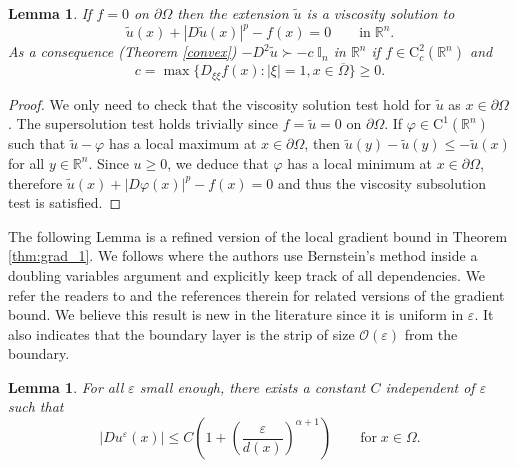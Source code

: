 \documentclass[12pt,reqno]{amsart}
\numberwithin{figure}{section}
\theoremstyle{plain}
\newtheorem{lem}[thm]{Lemma}
\theoremstyle{remark}
\numberwithin{equation}{section}
\newcommand{\R}{\mathbb{R}}
\begin{document}
\begin{lem} If $f = 0$ on $\partial\Omega$ then the extension $\tilde{u}$ is a viscosity solution to
\begin{equation*}
    \tilde{u}(x)+|D\tilde{u}(x)|^p - f(x) = 0 \qquad\text{in}\;\R^n.
\end{equation*}
As a consequence (Theorem \ref{convex}) $-D^2\tilde{u} \succ -c\;\mathbb{I}_n$ in $\R^n$ if $f\in \mathrm{C}_c^2(\R^n)$ and 
\begin{equation}\label{def_c}
    c = \max \big\lbrace  D_{\xi\xi}f(x): |\xi|=1, x\in \overline{\Omega} \big\rbrace\geq 0.
\end{equation}
\end{lem}
\begin{proof} We only need to check that the viscosity solution test hold for $\tilde{u}$ as $x\in \partial\Omega$. The supersolution test holds trivially since $f = \tilde{u} = 0$ on $\partial\Omega$. If $\varphi\in \mathrm{C}^1(\R^n)$ such that $\tilde{u} - \varphi$ has a local maximum at $x\in \partial\Omega$, then $\tilde{u}(y) - \tilde{u}(y) \leq - \tilde{u}(x)$ for all $y\in \R^n$. Since $u\geq 0$, we deduce that $\varphi$ has a local minimum at $x\in \partial\Omega$, therefore $\tilde{u}(x)+|D\varphi(x)|^p - f(x) = 0$ and thus the viscosity subsolution test is satisfied.
\end{proof}


The following Lemma is a refined version of the local gradient bound in Theorem \ref{thm:grad_1}. We follows \cite[Theorem 3.1]{Armstrong2015a} where the authors use Bernstein's method inside a doubling variables argument and explicitly keep track of all dependencies. We refer the readers to \cite{barles_weak_1991,capuzzo_dolcetta_holder_2010} and the references therein for related versions of the gradient bound. We believe this result is new in the literature since it is uniform in $\varepsilon$. It also indicates that the boundary layer is the strip of size $\mathcal{O}(\varepsilon)$ from the boundary.



\begin{lem}\label{lem:boundDu^eps} For all $\varepsilon$ small enough, there exists a constant $C$ independent of $\varepsilon$ such that
\begin{equation}\label{eq:es_final}
|Du^\varepsilon(x)| \leq C\left( 1 + \left(\frac{\varepsilon}{d(x)}\right)^{\alpha+1}\right) \qquad\text{for}\;x\in \Omega.
\end{equation}
\end{lem}
\end{document}

